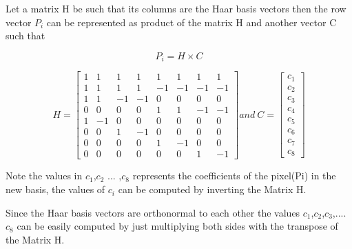 \documentclass{article}
\begin{document}
\setlength{\parindent}{1cm}
Let a matrix H be such that its columns are the Haar basis vectors then the row vector $P_i$ can be represented as product of the matrix H and another vector C such that


\begin{equation*}
P_i = H
\times C
\end{equation*}

\begin{equation*}
H = \begin{bmatrix} 1 & 1 & 1 & 1 & 1 & 1 & 1 & 1 \\
                1 & 1 & 1 & 1 & -1 & -1 & -1 & -1 \\
                1 & 1 & -1 & -1 & 0 & 0 & 0 & 0 \\
                0 & 0 & 0 & 0 & 1 & 1 & -1 & -1 \\
                1 & -1 & 0 & 0 & 0 & 0 & 0 & 0 \\
                0 & 0 & 1 & -1 & 0 & 0 & 0 & 0 \\
                0 & 0 & 0 & 0 & 1 & -1 & 0 & 0 \\
                0 & 0 & 0 & 0 & 0 & 0 & 1 & -1 
\end{bmatrix} and  \  
C = \begin{bmatrix} c_1\\
                    c_2\\
                    c_3\\
                    c_4\\
                    c_5\\
                    c_6\\
                    c_7\\
                    c_8
\end{bmatrix}
\end{equation*}

\setlength{\parindent}{1cm}
Note the values in $c_1$,$c_2$ ... ,$c_8$ represents the coefficients of the pixel(Pi) in the new basis, the values of $c_i$ can be computed by inverting the Matrix H.

\setlength{\parindent}{1cm}
Since the Haar basis vectors are orthonormal to each other the values $c_1$,$c_2$,$c_3$,....$c_8$ can be easily computed by just multiplying both sides with the transpose of the Matrix H. 
\end{document}
